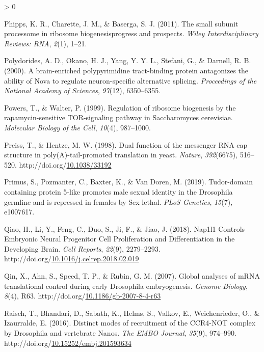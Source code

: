 \documentclass[12pt,oneside]{reedthesis}
\newlength{\cslhangindent}
\newenvironment{CSLReferences}[2] %
 {%
  \setlength{\parindent}{0pt}
  \ifodd #1 \everypar{\setlength{\hangindent}{\cslhangindent}}\ignorespaces\fi
  \ifnum #2 > 0
  \setlength{\parskip}{#2\baselineskip}
  \fi
 }%
 {}
\begin{document}
\begin{CSLReferences}{1}{0}
\leavevmode\hypertarget{ref-Phipps2011a}{}%
Phipps, K. R., Charette, J. M., \& Baserga, S. J. (2011). The small subunit processome in ribosome biogenesis{}progress and prospects. \emph{Wiley Interdisciplinary Reviews: RNA}, \emph{2}(1), 1--21.

\leavevmode\hypertarget{ref-Polydorides2000}{}%
Polydorides, A. D., Okano, H. J., Yang, Y. Y. L., Stefani, G., \& Darnell, R. B. (2000). A brain-enriched polypyrimidine tract-binding protein antagonizes the ability of {Nova} to regulate neuron-specific alternative splicing. \emph{Proceedings of the National Academy of Sciences}, \emph{97}(12), 6350--6355.

\leavevmode\hypertarget{ref-powersRegulationRibosomeBiogenesis1999}{}%
Powers, T., \& Walter, P. (1999). Regulation of ribosome biogenesis by the rapamycin-sensitive {TOR-signaling} pathway in {Saccharomyces} cerevisiae. \emph{Molecular Biology of the Cell}, \emph{10}(4), 987--1000.

\leavevmode\hypertarget{ref-Preiss1998g}{}%
Preiss, T., \& Hentze, M. W. (1998). Dual function of the messenger {RNA} cap structure in poly({A})-tail-promoted translation in yeast. \emph{Nature}, \emph{392}(6675), 516--520. http://doi.org/\href{https://doi.org/10.1038/33192}{10.1038/33192}

\leavevmode\hypertarget{ref-Primus2019}{}%
Primus, S., Pozmanter, C., Baxter, K., \& Van Doren, M. (2019). Tudor-domain containing protein 5-like promotes male sexual identity in the {Drosophila} germline and is repressed in females by {Sex} lethal. \emph{PLoS Genetics}, \emph{15}(7), e1007617.

\leavevmode\hypertarget{ref-qiaoNap1l1ControlsEmbryonic2018}{}%
Qiao, H., Li, Y., Feng, C., Duo, S., Ji, F., \& Jiao, J. (2018). Nap1l1 {Controls Embryonic Neural Progenitor Cell Proliferation} and {Differentiation} in the {Developing Brain}. \emph{Cell Reports}, \emph{22}(9), 2279--2293. http://doi.org/\href{https://doi.org/10.1016/j.celrep.2018.02.019}{10.1016/j.celrep.2018.02.019}

\leavevmode\hypertarget{ref-qinGlobalAnalysesMRNA2007a}{}%
Qin, X., Ahn, S., Speed, T. P., \& Rubin, G. M. (2007). Global analyses of {mRNA} translational control during early {Drosophila} embryogenesis. \emph{Genome Biology}, \emph{8}(4), R63. http://doi.org/\href{https://doi.org/10.1186/gb-2007-8-4-r63}{10.1186/gb-2007-8-4-r63}

\leavevmode\hypertarget{ref-Raisch2016h}{}%
Raisch, T., Bhandari, D., Sabath, K., Helms, S., Valkov, E., Weichenrieder, O., \& Izaurralde, E. (2016). Distinct modes of recruitment of the {CCR4-NOT} complex by {Drosophila} and vertebrate {Nanos}. \emph{The EMBO Journal}, \emph{35}(9), 974--990. http://doi.org/\href{https://doi.org/10.15252/embj.201593634}{10.15252/embj.201593634}


\end{CSLReferences}
\end{document}
